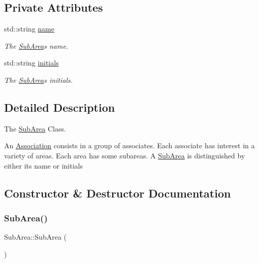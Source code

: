 \subsection*{Private Attributes}
\begin{DoxyCompactItemize}
\item 
std\+::string \mbox{\hyperlink{classSubArea_aa1b0997da15caea7144ae73963da9f82}{name}}
\begin{DoxyCompactList}\small\item\em The \mbox{\hyperlink{classSubArea}{Sub\+Area}}\textquotesingle{}s name. \end{DoxyCompactList}\item 
std\+::string \mbox{\hyperlink{classSubArea_a3e0a456f5ce325e2a778a17d1929b5d0}{initials}}
\begin{DoxyCompactList}\small\item\em The \mbox{\hyperlink{classSubArea}{Sub\+Area}}\textquotesingle{}s initials. \end{DoxyCompactList}\end{DoxyCompactItemize}


\subsection{Detailed Description}
The \mbox{\hyperlink{classSubArea}{Sub\+Area}} Class. 

An \mbox{\hyperlink{classAssociation}{Association}} consists in a group of associates. Each associate has interest in a variety of areas. Each area has some subareas. A \mbox{\hyperlink{classSubArea}{Sub\+Area}} is distinguished by either its name or initials 

\subsection{Constructor \& Destructor Documentation}
\mbox{\label{classSubArea_a9649b113a07cc887aec5bdf83b75666c}} 
\subsubsection{\texorpdfstring{Sub\+Area()}{SubArea()}\hspace{0.1cm}{\footnotesize\ttfamily [1/2]}}
{\footnotesize\ttfamily Sub\+Area\+::\+Sub\+Area (\begin{DoxyParamCaption}{ }\end{DoxyParamCaption})}



